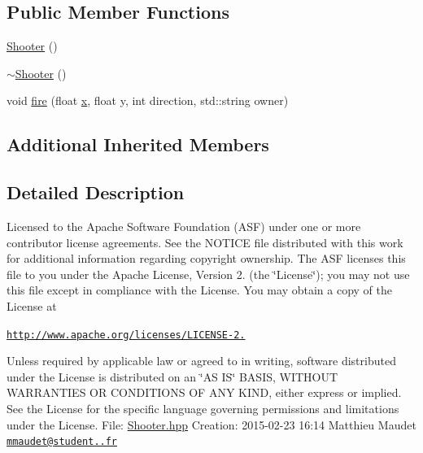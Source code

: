 \subsection*{Public Member Functions}
\begin{DoxyCompactItemize}
\item 
\hyperlink{class_shooter_acc429ebafcc36bb592c752097c22657f}{Shooter} ()
\item 
\hyperlink{class_shooter_a721a5786ef137f1b27f634988cc12f7e}{$\sim$\-Shooter} ()
\item 
void \hyperlink{class_shooter_adc34229494950169d09804f1d524ac7d}{fire} (float \hyperlink{jquery_8js_a4c3eadaa5164016d2c340d495fc6e55e}{x}, float y, int direction, std\-::string owner)
\end{DoxyCompactItemize}
\subsection*{Additional Inherited Members}


\subsection{Detailed Description}
Licensed to the Apache Software Foundation (A\-S\-F) under one or more contributor license agreements. See the N\-O\-T\-I\-C\-E file distributed with this work for additional information regarding copyright ownership. The A\-S\-F licenses this file to you under the Apache License, Version 2. (the \char`\"{}\-License\char`\"{}); you may not use this file except in compliance with the License. You may obtain a copy of the License at

\href{http://www.apache.org/licenses/LICENSE-2.0}{\tt http\-://www.\-apache.\-org/licenses/\-L\-I\-C\-E\-N\-S\-E-\/2.}

Unless required by applicable law or agreed to in writing, software distributed under the License is distributed on an \char`\"{}\-A\-S I\-S\char`\"{} B\-A\-S\-I\-S, W\-I\-T\-H\-O\-U\-T W\-A\-R\-R\-A\-N\-T\-I\-E\-S O\-R C\-O\-N\-D\-I\-T\-I\-O\-N\-S O\-F A\-N\-Y K\-I\-N\-D, either express or implied. See the License for the specific language governing permissions and limitations under the License. File\-: \hyperlink{_shooter_8hpp}{Shooter.\-hpp} Creation\-: 2015-\/02-\/23 16\-:14 Matthieu Maudet \href{mailto:mmaudet@student.42.fr}{\tt mmaudet@student..\-fr} 

